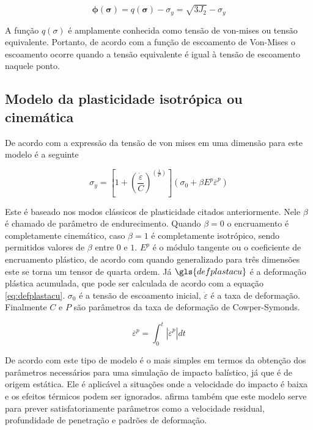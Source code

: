 \begin{equation} \label{eq:vonesc}
    \boldsymbol{\phi}(\boldsymbol{\sigma}) = q(\boldsymbol{\sigma}) - \sigma_y = \sqrt{3 J_2} - \sigma_y
\end{equation}

 A função  $ q(\sigma) $ é amplamente conhecida como tensão de von-mises ou tensão equivalente. Portanto, de acordo com a função de escoamento de Von-Mises o escoamento ocorre quando a tensão equivalente é igual à tensão de escoamento naquele ponto.
 
 \subsection{Modelo da plasticidade isotrópica ou cinemática}

De acordo com \cite{rao_narayanamurthy_simha_2016} a expressão da tensão de von mises em uma dimensão para este modelo é a seguinte 

\begin{equation}
    \sigma_y = \left[1 + (\frac{\dot{\varepsilon}}{C})^{(\frac{1}{P})} \right](\sigma_0 + \beta E^p \overline{\varepsilon}^p)
\end{equation}

Este é baseado nos modos clássicos de plasticidade citados anteriormente. Nele $ \beta $ é chamado de parâmetro de endurecimento. Quando $ \beta = 0 $ o encruamento é completamente cinemático, caso $ \beta = 1 $ é completamente isotrópico, sendo permitidos valores de $ \beta $ entre $0$ e $1$. $ E^p $ é o módulo tangente ou o coeficiente de encruamento plástico, de acordo com \cite{neto_peric_owens_2008} quando generalizado para três dimensões
este se torna um tensor de quarta ordem. Já $\gls{defplastacu}$ é a deformação plástica acumulada, que pode ser calculada de acordo com a equação \ref{eq:defplastacu}. $ \sigma_0 $ é a tensão de escoamento inicial, $\dot{\varepsilon} $ é a taxa de deformação. Finalmente $ C $ e $ P $ são parâmetros da taxa de deformação de Cowper-Symonds. \par 

\begin{equation} \label{eq:defplastacu}
    \overline{\varepsilon}^p = \int_0^t |\dot{\varepsilon}^p| dt
\end{equation}

De acordo com \cite{rao_narayanamurthy_simha_2016} este tipo de modelo é o mais simples em termos da obtenção dos parâmetros necessários para uma simulação de impacto balístico, já que é de origem estática. Ele é aplicável a situações onde a velocidade do impacto é baixa e os efeitos térmicos podem ser ignorados. \cite{rao_narayanamurthy_simha_2016} afirma também que este modelo serve para prever satisfatoriamente
 parâmetros como a velocidade residual, profundidade de penetração e padrões de deformação.
 
